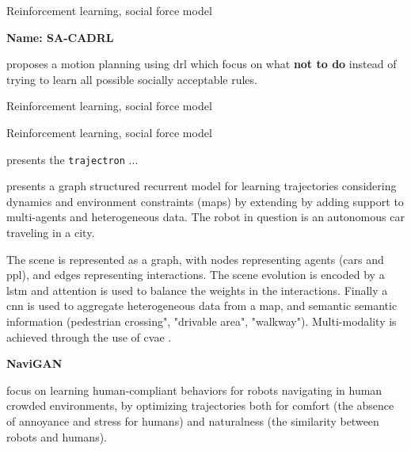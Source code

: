 \cite{chen2017socially} Reinforcement learning, social force model 

\textbf{Name: SA-CADRL}

\cite{chen2017socially} proposes a motion planning using \gls{drl} which focus on what \textbf{not to do} instead of trying to learn all possible socially acceptable rules.


\cite{everett2018motion} Reinforcement learning, social force model


\cite{long2018towards} Reinforcement learning, social force model


\cite{ivanovic2019trajectron} presents the \texttt{trajectron} ...


\cite{salzmann2020trajectron++}  presents a graph structured recurrent model for learning trajectories considering dynamics and environment constraints (maps) by extending \cite{ivanovic2019trajectron} by adding support to multi-agents and heterogeneous data. The robot in question is an autonomous car traveling in a city.

The scene is represented as a graph, with nodes representing agents (cars and ppl), and edges representing interactions.
%
The scene evolution is encoded by a \gls{lstm} and attention is used to balance the weights in the interactions.
%
Finally a \gls{cnn} is used to aggregate heterogeneous data from a map, and semantic semantic information (pedestrian crossing", "drivable area", "walkway"). 
%
Multi-modality is achieved through the use of \gls{cvae} .


\textbf{NaviGAN}

\cite{tsai2020generative} focus on learning human-compliant behaviors for robots navigating in human crowded environments, by optimizing trajectories both for comfort (the absence of annoyance and stress for humans) and naturalness (the similarity between robots and humans).

